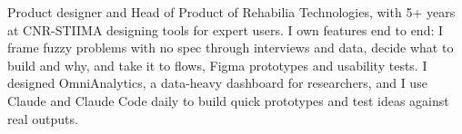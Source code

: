 {Product designer and Head of Product of Rehabilia Technologies, with 5+ years at CNR-STIIMA designing tools for expert users. I own features end to end: I frame fuzzy problems with no spec through interviews and data, decide what to build and why, and take it to flows, Figma prototypes and usability tests. I designed OmniAnalytics, a data-heavy dashboard for researchers, and I use Claude and Claude Code daily to build quick prototypes and test ideas against real outputs.}
